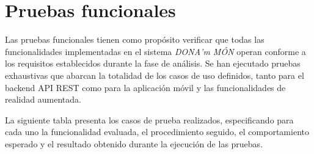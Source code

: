 
\section{Pruebas funcionales}

Las pruebas funcionales tienen como propósito verificar que todas las funcionalidades implementadas en el sistema \textit{DONA'm MÓN} operan conforme a los requisitos establecidos durante la fase de análisis. Se han ejecutado pruebas exhaustivas que abarcan la totalidad de los casos de uso definidos, tanto para el backend API REST como para la aplicación móvil y las funcionalidades de realidad aumentada.

La siguiente tabla presenta los casos de prueba realizados, especificando para cada uno la funcionalidad evaluada, el procedimiento seguido, el comportamiento esperado y el resultado obtenido durante la ejecución de las pruebas.

